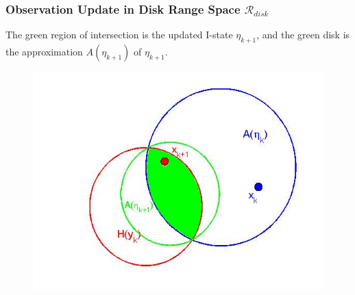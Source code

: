 \documentclass[compress]{beamer}
\begin{document}
\begin{frame} \frametitle{Observation Update in Disk Range Space $\mathcal{R}_{disk}$}
 The green region of intersection is the updated I-state $\eta_{k+1}$, and the green disk
    is the approximation $A(\eta_{k+1})$ of $\eta_{k+1}$.
			
    \begin{figure}
    \includegraphics[scale=0.3]{circle3_2.jpg}
    \end{figure}
\transboxout
\end{frame}
\end{document}

